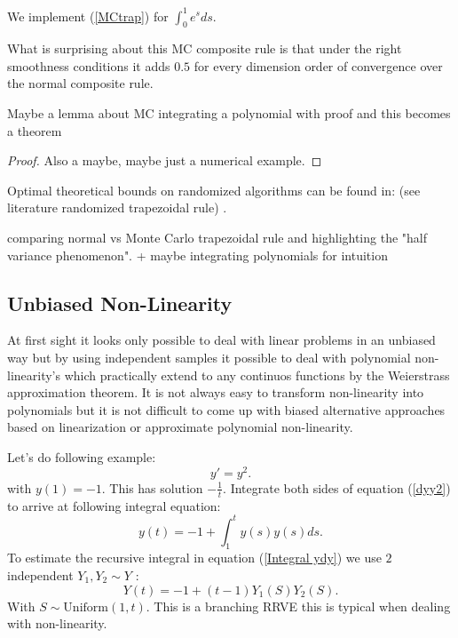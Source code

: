 \documentclass[a4paper,12pt]{article}
\begin{document}
\begin{pythonn}
    We implement (\ref{MCtrap}) for $\int_{0}^{1}e^{s}ds$.
    \vspace*{0.5cm}
\end{pythonn}

What is surprising about this MC composite rule is that
under the right smoothness conditions it adds $0.5$
for every dimension order of convergence over the normal
composite rule.

\begin{lemma}
    Maybe a lemma about MC integrating a polynomial
    with proof and this becomes a theorem
\end{lemma}

\begin{proof}
    Also a maybe, maybe just a numerical example.
\end{proof}

\begin{related}
    Optimal theoretical bounds on randomized algorithms can be found in:
    (see literature randomized trapezoidal rule)
    \cite{wu_randomised_2020}.
\end{related}

comparing normal vs Monte Carlo trapezoidal rule and highlighting the "half variance phenomenon".
+ maybe integrating polynomials for intuition

\subsection{Unbiased Non-Linearity}
At first sight it looks only possible to deal with linear problems in an unbiased way but by using
independent samples it possible to deal with polynomial non-linearity's which practically extend
to any continuos functions by the Weierstrass approximation theorem.  It is not always easy to
transform non-linearity into polynomials but it is not difficult to come up with
biased alternative approaches based on linearization or approximate polynomial non-linearity.


\begin{example}[$y'=y^{2}$]
    Let's do following example:
    \begin{equation} \label{dyy2}
        y'= y^2.
    \end{equation}
    with $y(1)=-1$. This has solution $-\frac{1}{t}$. Integrate both sides of
    equation (\ref{dyy2}) to arrive at following integral equation:
    \begin{equation} \label{Integral dyy2}
        y(t) = -1 + \int_{1}^{t} y(s) y(s) ds .
    \end{equation}
    To estimate the recursive integral in equation (\ref{Integral ydy}) we use $2$
    independent $Y_{1},Y_{2}\sim Y$ :
    \[
        Y(t) = -1 + (t-1) Y_{1}(S) Y_{2}(S)
        .\]
    With $S \sim \text{Uniform}(1,t)$. This is a branching RRVE this is
    typical when dealing with non-linearity.
\end{example}
\end{document}

